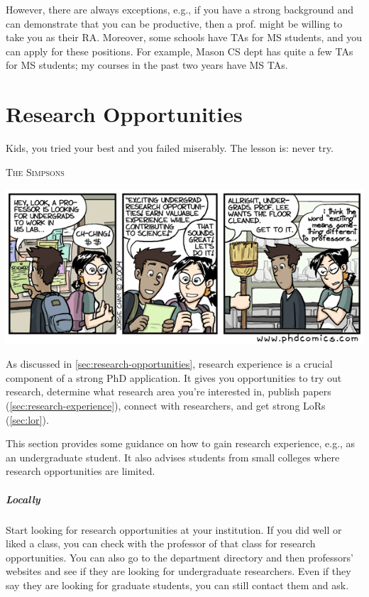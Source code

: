 \documentclass[oneside,11pt,dvipsnames]{book}
\def\chapterinfo#1{%
  \addcontentsline{toc}{chapterinfo}{%
    \noexpand\numberline{}\color{black}{#1}}%
}
\begin{document}
However, there are always exceptions, e.g., if you have a strong background and can demonstrate that you can be productive, then a prof. might be willing to take you as their RA.
Moreover, some schools have TAs for MS students, and you can apply for these positions. For example, Mason CS dept has quite a few TAs for MS students; my courses in the past two years have MS TAs.

\chapter{Research Opportunities}\label{sec:research-opportunities}
\chapterinfo{How to get research experience as an undergrad.}

\epigraph{\vspace{-0.2in} Kids, you tried your best and you failed miserably. The lesson is: never try.}{\textsc{The Simpsons}}



\begin{center}
    \includegraphics[scale=0.5]{files/phd100404s.png}
  \end{center}

As discussed in \autoref{sec:research-opportunities}, research experience is a crucial component of a strong PhD application. It gives you opportunities to try out research, determine what research area you're interested in, publish papers (\autoref{sec:research-experience}), connect with researchers, and get strong LoRs (\autoref{sec:lor}).

 This section provides some guidance on how to gain research experience, e.g., as an undergraduate student.  It also advises students from small colleges where research opportunities are limited.

\paragraph{Locally} Start looking for research opportunities at your institution.
If you did well or liked a class, you can check with the professor of that class for research opportunities.
You can also go to the department directory and then professors' websites and see if they are looking for undergraduate researchers.
Even if they say they are looking for graduate students, you can still contact them and ask.
\end{document}
